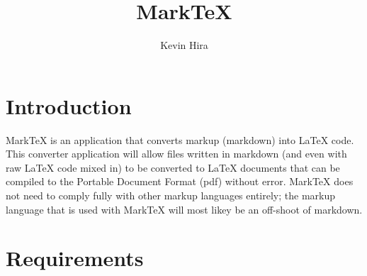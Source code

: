 \documentclass[10pt, a4paper]{article}
\title{MarkTeX}
\author{Kevin Hira}
\begin{document}
\maketitle

\section*{Introduction}
MarkTeX is an application that converts markup (markdown) into \LaTeX{} code. This converter application will allow files written in markdown (and even with raw \LaTeX{} code mixed in) to be converted to \LaTeX{} documents that can be compiled to the Portable Document Format (pdf) without error. MarkTeX does not need to comply fully with other markup languages entirely; the markup language that is used with MarkTeX will most likey be an off-shoot of markdown.

\pagebreak

\section{Requirements}
\end{document}
